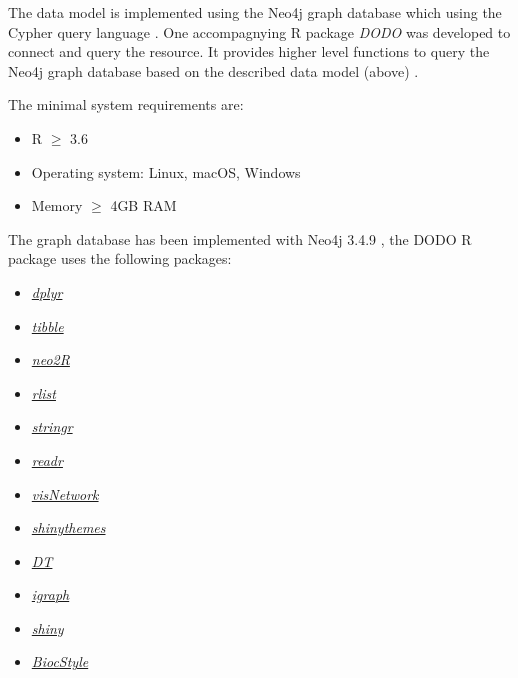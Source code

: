 \documentclass[9pt,a4paper,]{extarticle}
\begin{document}
The data model is implemented using the Neo4j graph database which using the Cypher query language \citep{Neo4j2020}. One accompagnying R package \emph{DODO} was developed to connect and query the resource. It provides higher level functions to query the Neo4j graph database based on the described data model (above) \citep{R2019}.

The minimal system requirements are:

\begin{itemize}
\item
  R \(\geq\) 3.6
\item
  Operating system: Linux, macOS, Windows
\item
  Memory \(\geq\) 4GB RAM
\end{itemize}

The graph database has been implemented with Neo4j 3.4.9 \citep{Neo4j2020}, the DODO R package uses the following packages:

\begin{itemize}
\item
  \emph{\href{https://CRAN.R-project.org/package=dplyr}{dplyr}} \citep{Wickham2019}
\item
  \emph{\href{https://CRAN.R-project.org/package=tibble}{tibble}} \citep{Muller2019}
\item
  \emph{\href{https://CRAN.R-project.org/package=neo2R}{neo2R}} \citep{Godard2020}
\item
  \emph{\href{https://CRAN.R-project.org/package=rlist}{rlist}} \citep{Ren2016}
\item
  \emph{\href{https://CRAN.R-project.org/package=stringr}{stringr}} \citep{Wickham2019b}
\item
  \emph{\href{https://CRAN.R-project.org/package=readr}{readr}} \citep{Wickham2018}
\item
  \emph{\href{https://CRAN.R-project.org/package=visNetwork}{visNetwork}} \citep{Almende2017}
\item
  \emph{\href{https://CRAN.R-project.org/package=shinythemes}{shinythemes}} \citep{Chang2018}
\item
  \emph{\href{https://CRAN.R-project.org/package=DT}{DT}} \citep{Xie2019}
\item
  \emph{\href{https://CRAN.R-project.org/package=igraph}{igraph}} \citep{Csardi2006}
\item
  \emph{\href{https://CRAN.R-project.org/package=shiny}{shiny}} \citep{Chang2019}
\item
  \emph{\href{https://CRAN.R-project.org/package=BiocStyle}{BiocStyle}}\citep{Oles2020}
\end{itemize}
\end{document}
